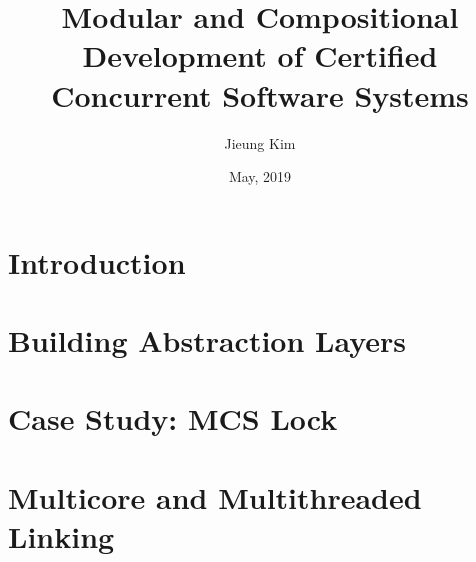 \documentclass[letterpaper,11pt]{yalephd}
\begin{document}
\title{Modular and Compositional Development of Certified Concurrent Software Systems}
\author{Jieung Kim}
\date{May, 2019} 

\frontmatter

\begin{abstract} 

\end{abstract}

\maketitle
\restoregeometry
{} %

\tableofcontents
\listoffigures %
\listoftables %

%

\mainmatter


\chapter{Introduction}
\label{chapter:introduction}


\chapter{Building Abstraction Layers}
\label{chapter:ccal}






\chapter{Case Study: MCS Lock}
\label{chapter:mcs-lock}







\chapter{Multicore and Multithreaded Linking}
\label{chapter:linking}
\end{document}
